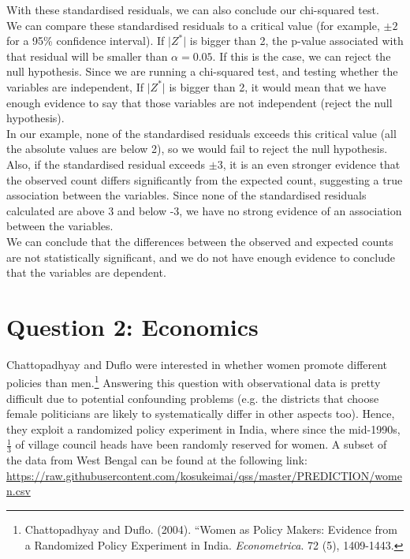 \documentclass[12pt,letterpaper]{article}
\begin{document}
\begin{enumerate}
	
	With these standardised residuals, we can also conclude our chi-squared test. \\
	We can compare these standardised residuals to a critical value (for example, \( \pm 2 \) for a 95\% confidence interval). If \( \lvert Z^* \rvert \) is bigger than 2, the p-value associated with that residual will be smaller than \( \alpha = 0.05 \). If this is the case, we can reject the null hypothesis. Since we are running a chi-squared test, and testing whether the variables are independent, If \( \lvert Z^* \rvert \) is bigger than 2, it would mean that we have enough evidence to say that those variables are not independent (reject the null hypothesis).\\
	In our example, none of the standardised residuals exceeds this critical value (all the absolute values are below 2), so we would fail to reject the null hypothesis. \\
	Also, if the standardised residual exceeds  \( \pm 3 \), it is an even stronger evidence that the observed count differs significantly from the expected count, suggesting a true association between the variables. Since none of the standardised residuals calculated are above 3 and below -3, we have no strong evidence of an association between the variables. \\
	We can conclude that the differences between the observed and expected counts are not statistically significant, and we do not have enough evidence to conclude that the variables are dependent.
	

	
	
	
\end{enumerate}
\newpage

\section*{Question 2: Economics}
Chattopadhyay and Duflo were interested in whether women promote different policies than men.\footnote{Chattopadhyay and Duflo. (2004). ``Women as Policy Makers: Evidence from a Randomized Policy Experiment in India. \textit{Econometrica}. 72 (5), 1409-1443.} Answering this question with observational data is pretty difficult due to potential confounding problems (e.g. the districts that choose female politicians are likely to systematically differ in other aspects too). Hence, they exploit a randomized policy experiment in India, where since the mid-1990s, $\frac{1}{3}$ of village council heads have been randomly reserved for women. A subset of the data from West Bengal can be found at the following link: \url{https://raw.githubusercontent.com/kosukeimai/qss/master/PREDICTION/women.csv}\\
\end{document}
